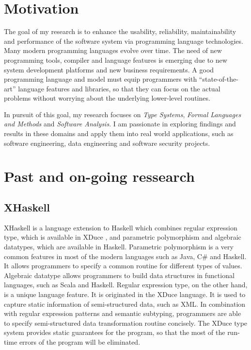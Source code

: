\documentclass[12pt]{article}
\theoremstyle{plain} \numberwithin{equation}{section}
\theoremstyle{definition}
\newcommand{\kl}[1]{}
\begin{document}
\raisebox{1cm}



\section{Motivation}

\kl{What is the goal of my research?}
The goal of my research is to enhance the usability, reliability, 
maintainability and performance of the software system via programming language
technologies. Many modern programming languages evolve over time.
The need of new programming tools, compiler and  language features is 
emerging due to new system development platforms and new 
business requirements. A good programming language and model must equip
programmers with ``state-of-the-art'' language features
and libraries, so that they can focus on the actual problems without
worrying about the underlying lower-level routines.


\kl{What is the focus?}
In pursuit of this goal, my research focuses on
{\em Type Systems},  {\em Formal Languages and Methods} and {\em Software Analysis}.
I am passionate in exploring findings and results in these domains and apply them
into real world applications,
such as software engineering, data engineering and software security projects.


\section{Past and on-going ressearch}

\subsection{XHaskell}
XHaskell is a language extension to Haskell \cite{xhaskell} 
which combines regular expression type, 
which is available in XDuce \cite{XDuceTyPHD}, and parametric
polymorphism and algebraic datatypes, which are available in Haskell.
Parametric polymorphism is a very common features in most of the 
modern languages such as Java, C\# and Haskell. It allows programmers to specify a
common routine for different types of values. Algebraic datatype
allows programmers to build data structures in functional languages,
such as Scala and Haskell. Regular expression
type, on the other hand, is a unique language feature. 
It is originated in the XDuce language. It is used to capture
static information of semi-structured data, such as XML. In
combination with regular expression patterns and semantic subtyping,
programmers are able to specify semi-structured data transformation routine concisely.
The XDuce type system provides static guarantees for the program, so that
the most of the run-time errors of the program will be eliminated.
\end{document}

